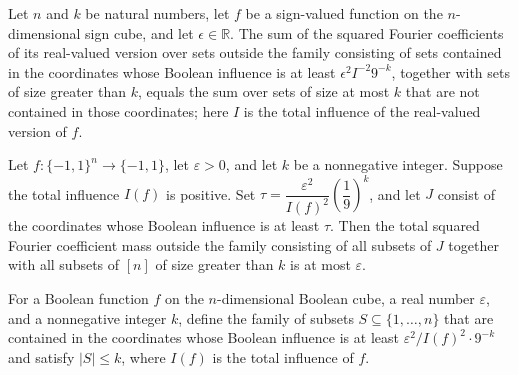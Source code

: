 \begin{theorem}
\label{FABL.fourierWeightOutside_theorem9_28Family}
\leanok
{}
Let $n$ and $k$ be natural numbers, let $f$ be a sign-valued function on the
$n$-dimensional sign cube, and let $\epsilon\in\mathbb{R}$. The sum of the squared
Fourier coefficients of its real-valued version over sets outside the family consisting
of sets contained in the coordinates whose Boolean influence is at least $\epsilon^2
I^{-2}9^{-k}$, together with sets of size greater than $k$, equals the sum over sets of
size at most $k$ that are not contained in those coordinates; here $I$ is the total
influence of the real-valued version of $f$.
\end{theorem}

\begin{theorem}
\label{FABL.theorem9_28_spectrum_concentrated}
\leanok
{}
Let $f:\{-1,1\}^n\to\{-1,1\}$, let $\varepsilon>0$, and let $k$ be a nonnegative
integer. Suppose the total influence $I(f)$ is positive. Set
$\tau=\dfrac{\varepsilon^2}{I(f)^2}\left(\dfrac{1}{9}\right)^k$, and let $J$ consist of
the coordinates whose Boolean influence is at least $\tau$. Then the total squared
Fourier coefficient mass outside the family consisting of all subsets of $J$ together
with all subsets of $[n]$ of size greater than $k$ is at most $\varepsilon$.
\end{theorem}

\begin{definition}
\label{FABL.theorem9_28SmallFamily}
\leanok
{}
For a Boolean function $f$ on the $n$-dimensional Boolean cube, a real number
$\varepsilon$, and a nonnegative integer $k$, define the family of subsets
$S\subseteq\{1,\ldots,n\}$ that are contained in the coordinates whose Boolean influence
is at least $\varepsilon^2/I(f)^2\cdot 9^{-k}$ and satisfy $|S|\le k$, where $I(f)$ is
the total influence of $f$.
\end{definition}

